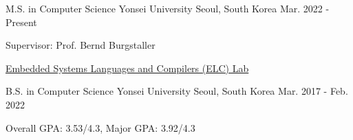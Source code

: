 

\begin{cventries}

  \cventry
    {M.S. in Computer Science} %
    {Yonsei University} %
    {Seoul, South Korea} %
    {Mar. 2022 - Present} %
    {
      \begin{cvitems} %
        \item {Supervisor: Prof. Bernd Burgstaller}
        \item {\href{https://elc.yonsei.ac.kr}{Embedded Systems Languages and Compilers (ELC) Lab}}
      \end{cvitems}
    }

  \cventry
    {B.S. in Computer Science} %
    {Yonsei University} %
    {Seoul, South Korea} %
    {Mar. 2017 - Feb. 2022} %
    {
      \begin{cvitems} %
        \item {Overall GPA: 3.53/4.3, Major GPA: 3.92/4.3}
      \end{cvitems}
    }
\end{cventries}
